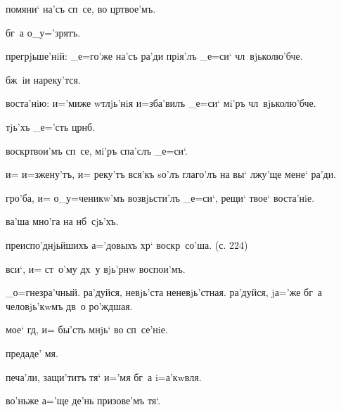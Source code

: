 
помяни` на'съ сп~се, во цр твое'мъ.

бг~а о_у='зрятъ.

прегрjьше'нiй: _е=го'же на'съ ра'ди прiя'лъ _е=си` 
чл~вjьколю'бче.

бж~iи нареку'тся.

воста'нiю: и='миже w\т тлjь'нiя и=зба'вилъ _е=си` мi'ръ 
чл~вjьколю'бче.

тjь'хъ _е='сть цр нб.

воскр твои'мъ сп~се, мi'ръ спа'слъ _е=си`.

и= и=зжену'тъ, и= реку'тъ вся'къ sо'лъ глаго'лъ на вы` 
лжу'ще мене` ра'ди.

гро'ба, и= о_у=ченикw'мъ возвjьсти'лъ _е=си`, рещи` твое` 
воста'нiе.

ва'ша мно'га на нб~сjь'хъ.

преиспо'днjьйшихъ а='довыхъ хр` воскр~со'ша. (с. 224)

вси`, и= ст~о'му дх~у вjь'рнw воспои'мъ.

_о=гнезра'чный. ра'дуйся, невjь'ста неневjь'стная. 
ра'дуйся, jа='же бг~а человjь'кwмъ дв~о ро'ждшая.

мое` гд, и= бы'сть мнjь` во сп~се'нiе.

предаде' мя.

печа'ли, защи'титъ тя` и='мя бг~а i=а'кwвля.

во'ньже а='ще де'нь призове'мъ тя`.

